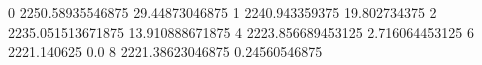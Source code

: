 0 2250.58935546875 29.44873046875
1 2240.943359375 19.802734375
2 2235.051513671875 13.910888671875
4 2223.856689453125 2.716064453125
6 2221.140625 0.0
8 2221.38623046875 0.24560546875
